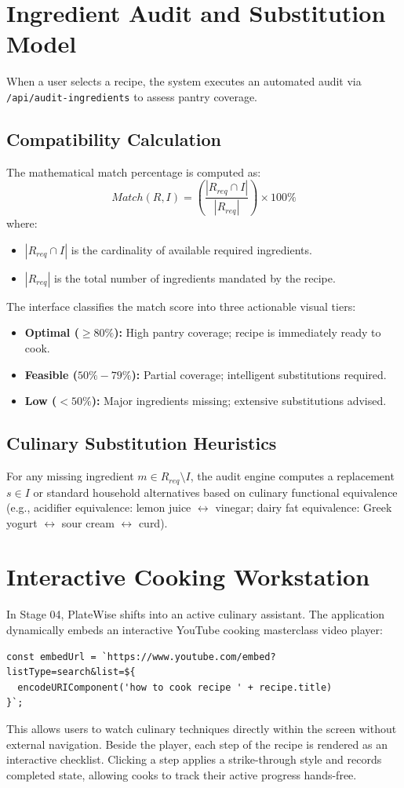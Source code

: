 \section{Ingredient Audit and Substitution Model}
When a user selects a recipe, the system executes an automated audit via \texttt{/api/audit-ingredients} to assess pantry coverage.

\subsection*{Compatibility Calculation}
The mathematical match percentage is computed as:
\begin{equation}
Match(R, I) = \left( \frac{|R_{req} \cap I|}{|R_{req}|} \right) \times 100\%
\end{equation}
where:
\begin{itemize}
    \item $|R_{req} \cap I|$ is the cardinality of available required ingredients.
    \item $|R_{req}|$ is the total number of ingredients mandated by the recipe.
\end{itemize}
The interface classifies the match score into three actionable visual tiers:
\begin{itemize}
    \item \textbf{Optimal ($\ge 80\%$):} High pantry coverage; recipe is immediately ready to cook.
    \item \textbf{Feasible ($50\% - 79\%$):} Partial coverage; intelligent substitutions required.
    \item \textbf{Low ($< 50\%$):} Major ingredients missing; extensive substitutions advised.
\end{itemize}

\subsection*{Culinary Substitution Heuristics}
For any missing ingredient $m \in R_{req} \setminus I$, the audit engine computes a replacement $s \in I$ or standard household alternatives based on culinary functional equivalence (e.g., acidifier equivalence: lemon juice $\leftrightarrow$ vinegar; dairy fat equivalence: Greek yogurt $\leftrightarrow$ sour cream $\leftrightarrow$ curd).

\section{Interactive Cooking Workstation}
In Stage 04, PlateWise shifts into an active culinary assistant. The application dynamically embeds an interactive YouTube cooking masterclass video player:
\begin{lstlisting}
const embedUrl = `https://www.youtube.com/embed?listType=search&list=${
  encodeURIComponent('how to cook recipe ' + recipe.title)
}`;
\end{lstlisting}
This allows users to watch culinary techniques directly within the screen without external navigation. Beside the player, each step of the recipe is rendered as an interactive checklist. Clicking a step applies a strike-through style and records completed state, allowing cooks to track their active progress hands-free.

